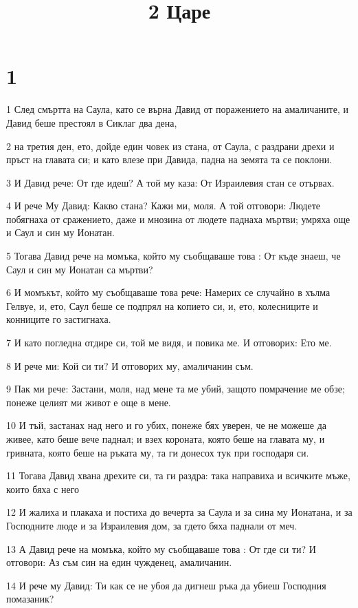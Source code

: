 

\title{2 Царе}


\chapter{1}

\par 1 След смъртта на Саула, като се върна Давид от поражението на амаличаните, и Давид беше престоял в Сиклаг два дена,
\par 2 на третия ден, ето, дойде един човек из стана, от Саула, с раздрани дрехи и пръст на главата си; и като влезе при Давида, падна на земята та се поклони.
\par 3 И Давид рече: От где идеш? А той му каза: От Израилевия стан се отървах.
\par 4 И рече Му Давид: Какво стана? Кажи ми, моля. А той отговори: Людете побягнаха от сражението, даже и мнозина от людете паднаха мъртви; умряха още и Саул и син му Ионатан.
\par 5 Тогава Давид рече на момъка, който му съобщаваше това : От къде знаеш, че Саул и син му Ионатан са мъртви?
\par 6 И момъкът, който му съобщаваше това рече: Намерих се случайно в хълма Гелвуе, и, ето, Саул беше се подпрял на копието си, и, ето, колесниците и конниците го застигнаха.
\par 7 И като погледна отдире си, той ме видя, и повика ме. И отговорих: Ето ме.
\par 8 И рече ми: Кой си ти? И отговорих му, амаличанин съм.
\par 9 Пак ми рече: Застани, моля, над мене та ме убий, защото помрачение ме обзе; понеже целият ми живот е още в мене.
\par 10 И тъй, застанах над него и го убих, понеже бях уверен, че не можеше да живее, като беше вече паднал; и взех короната, която беше на главата му, и гривната, която беше на ръката му, та ги донесох тук при господаря си.
\par 11 Тогава Давид хвана дрехите си, та ги раздра: така направиха и всичките мъже, които бяха с него
\par 12 И жалиха и плакаха и постиха до вечерта за Саула и за сина му Ионатана, и за Господните люде и за Израилевия дом, за гдето бяха паднали от меч.
\par 13 А Давид рече на момъка, който му съобщаваше това : От где си ти? И отговори: Аз съм син на един чужденец, амаличанин.
\par 14 И рече му Давид: Ти как се не убоя да дигнеш ръка да убиеш Господния помазаник?
